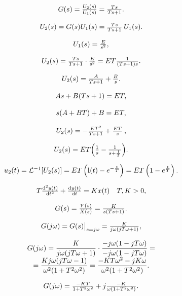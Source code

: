 \documentclass{article}
\begin{document}
\[
$$
G ( s )=\frac{U_{2} ( s )} {U_{1} ( s )}=\frac{T s} {T s+1}.
$$
\]

\[
$$
U_{2} ( s )=G ( s ) U_{1} ( s )=\frac{T s} {T s+1} \: U_{1} ( s ).
$$
\]

\[
$$
U_{1} ( s )=\frac{E} {s^{2}},
$$
\]

\[
$$
U_{2} ( s )=\frac{T s} {T s+1} \cdot\frac{E} {s^{2}}=E T \frac{1} {( T s+1 ) s}.
$$
\]

\[
$$
U_{2} ( s )=\frac{A} {T s+1}+\frac{B} {s}.
$$
\]

\[
$$
A s+B ( T s+1 )=E T,
$$
\]

\[
$$
s ( A+B T )+B=E T,
$$
\]

\[
$$
U_{2} ( s )=-\frac{E T^{2}} {T s+1}+\frac{E T} {s} \:,
$$
\]

\[
$$
U_{2} ( s )=E T {\left( \frac{1} {s}-\frac{1} {s+\frac{1} {T}} \right)}.
$$
\]

\[
$$
u_{2} ( t )=\mathcal{L}^{-1} [ U_{2} ( s ) ]=E T \left( \mathbf{l} ( t )-e^{-\frac{t} {T}} \right)=E T \left( 1-e^{\frac{t} {T}} \right).
$$
\]

\[
$$
T \frac{\mathrm{d}^{2} y ( t )} {\mathrm{d} t^{2}}+\frac{\mathrm{d} y ( t )} {\mathrm{d} t}=K x ( t ) \quad T, K > 0,
$$
\]

\[
$$
G ( s )=\frac{Y ( s )} {X ( s )}=\frac{K} {s ( T s+1 )}.
$$
\]

\[
$$
G ( j \omega)=G ( s ) \big|_{s=j \omega}=\frac{K} {j \omega( j T \omega+1 )},
$$
\]

\[
$$
\begin{array} {c} {G ( j \omega)=\displaystyle{\frac{K} {j \omega( j T \omega+1 )} \cdot\frac{-j \omega( 1-j T \omega)} {-j \omega( 1-j T \omega)}}=} \\ {=\displaystyle{\frac{K j \omega( j T \omega-1 )} {\omega^{2} ( 1+T^{2} \omega^{2} )}}=\frac{-K T \omega^{2}-j K \omega} {\omega^{2} ( 1+T^{2} \omega^{2} )}.} \\ \end{array}
$$
\]

\[
$$
G ( j \omega)=\frac{-K T} {1+T^{2} \omega^{2}}+j \frac{-K} {\omega( 1+T^{2} \omega^{2} )}.
$$
\]
\end{document}
